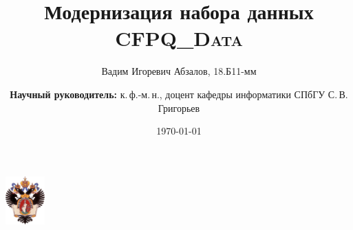 \documentclass[xcolor=table,xcdraw,aspectratio=169]{beamer}
\title[Модернизация CFPQ\_Data]{Модернизация набора данных \textsc{CFPQ\_Data}}
\institute[СПбГУ]{
Санкт-Петербургский государственный университет \\
Кафедра системного программирования }
\author[Вадим Абзалов]{Вадим Игоревич Абзалов, 18.Б11-мм \\
  \and  
    {\bfseries Научный руководитель:} к.\,ф.-м.\,н., доцент кафедры информатики СПбГУ С.\,В. Григорьев}
\date{\today}
\begin{document}
{
\begin{frame}
  \begin{center}
  {\includegraphics[width=1.5cm]{img/SPbGU_Logo.png}}
  \end{center}
  \titlepage
\end{frame}
}










\end{document}
